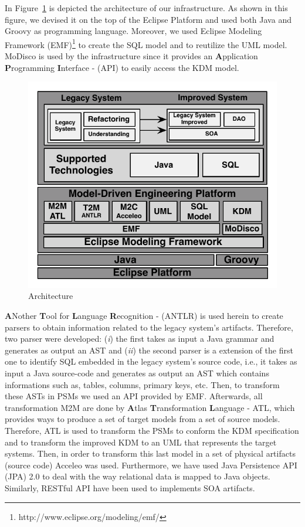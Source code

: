 
In Figure~\ref{fig:architecture} is depicted the architecture of our infrastructure. As shown in this figure, we devised it on the top of the Eclipse Platform and used both Java and Groovy as programming language. Moreover, we used Eclipse Modeling Framework (EMF)\footnote{http://www.eclipse.org/modeling/emf/} to create the SQL model and to reutilize the UML model. MoDisco is used by the infrastructure since it provides an
\textbf{A}pplication \textbf{P}rogramming \textbf{I}nterface - (API) to easily access the KDM model. 

\begin{figure}[!h]
\centering
 \includegraphics[scale=0.8]{Figuras/Arquitetura_da_Ferramenta}
\caption{Architecture}
\label{fig:architecture}
\end{figure}



\textbf{A}Nother \textbf{T}ool for \textbf{L}anguage \textbf{R}ecognition -  (ANTLR) is used herein to create parsers to obtain information related to the legacy system's artifacts. Therefore, two parser were developed: (\textit{i}) the first takes as input a Java grammar and generates as output an AST and (\textit{ii}) the second parser is a extension of the first one to identify SQL embedded in the legacy system's source code, i.e., it takes as input a Java source-code and generates as output an AST which contains informations such as, tables, columns, primary keys, etc. Then, to transform these ASTs in PSMs we used an API provided by EMF. Afterwards, all transformation M2M are done by \textbf{A}tlas \textbf{T}ransformation \textbf{L}anguage - ATL, which provides ways to produce a set of target models from a set of source models. Therefore, ATL is used to transform the PSMs to conform the KDM specification and to transform the improved KDM to an UML that represents the target systems. Then, in order to transform this last model in a set of physical artifacts (source code) Acceleo was used. Furthermore, we have used Java Persistence API (JPA) 2.0 to deal with the way relational data is mapped to Java objects. Similarly, RESTful API have been used to implements SOA artifacts.


